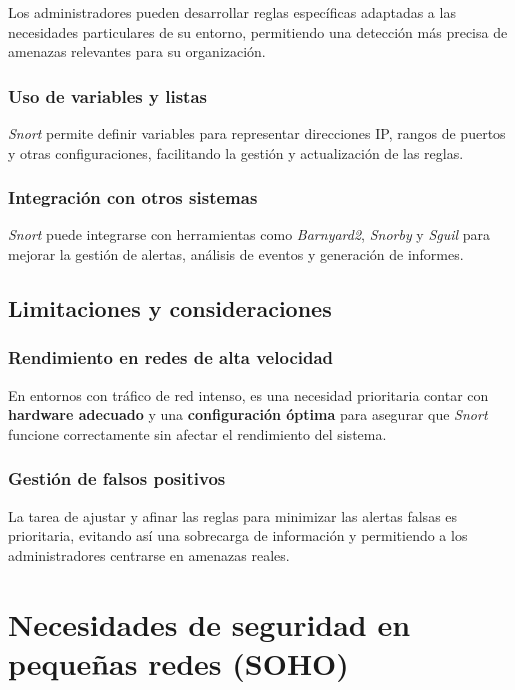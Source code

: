 \documentclass[11pt,a4paper,twoside]{report}
\begin{document}
Los administradores pueden desarrollar reglas específicas adaptadas a las necesidades particulares de su entorno, permitiendo una detección más precisa de amenazas relevantes para su organización.

\subsubsection{Uso de variables y listas}

\textit{Snort} permite definir variables para representar direcciones IP, rangos de puertos y otras configuraciones, facilitando la gestión y actualización de las reglas.

\subsubsection{Integración con otros sistemas}

\textit{Snort} puede integrarse con herramientas como \textit{Barnyard2}, \textit{Snorby} y \textit{Sguil} para mejorar la gestión de alertas, análisis de eventos y generación de informes.

\subsection{Limitaciones y consideraciones}

\subsubsection{Rendimiento en redes de alta velocidad}

En entornos con tráfico de red intenso, es una necesidad prioritaria contar con \textbf{hardware adecuado} y una \textbf{configuración óptima} para asegurar que \textit{Snort} funcione correctamente sin afectar el rendimiento del sistema.

\subsubsection{Gestión de falsos positivos}

La tarea de ajustar y afinar las reglas para minimizar las alertas falsas es prioritaria, evitando así una sobrecarga de información y permitiendo a los administradores centrarse en amenazas reales.

\section{Necesidades de seguridad en pequeñas redes (SOHO)}
\end{document}
